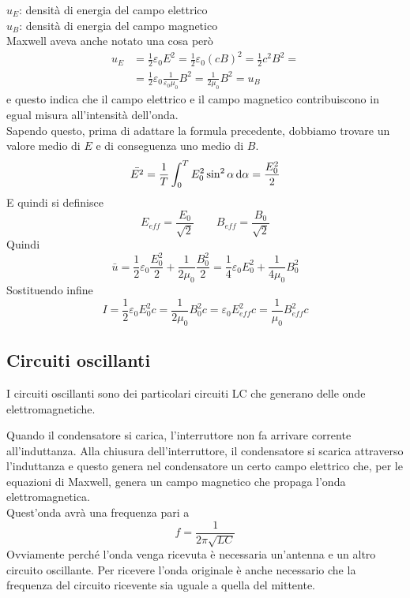 $u_E$: densità di energia del campo elettrico\\
$u_B$: densità di energia del campo magnetico\\ [\baselineskip]
Maxwell aveva anche notato una cosa però
\begin{align*}
  u_E &= \frac{1}{2}\varepsilon_0E^2=\frac{1}{2}\varepsilon_0(cB)^2=\frac{1}{2}c^2B^2=\\
      &= \frac{1}{2}\varepsilon_0 \frac{1}{\varepsilon_0\mu_0}B^2= \frac{1}{2\mu_0}B^2=u_B
\end{align*}
e questo indica che il campo elettrico e il campo magnetico contribuiscono in egual misura
all'intensità dell'onda.\\
Sapendo questo, prima di adattare la formula precedente, dobbiamo trovare un valore medio di $E$
e di conseguenza uno medio di $B$.
\begin{equation*}
  \bar{E^2}=\frac{1}{T}\int_0^T E_0^2\sin^2\alpha\mathop{}\!\mathrm{d}\alpha=\frac{E_0^2}{2}
\end{equation*}
E quindi si definisce
\begin{equation*}
  E_{eff} = \frac{E_0}{\sqrt{2}} \qquad B_{eff} = \frac{B_0}{\sqrt{2}}
\end{equation*}
Quindi
\begin{equation*}
  \bar{u}=\frac{1}{2}\varepsilon_0 \frac{E_0^2}{2}+\frac{1}{2\mu_0}\frac{B_0^2}{2}=
  \frac{1}{4}\varepsilon_0E_0^2+\frac{1}{4\mu_0}B_0^2
\end{equation*}
Sostituendo infine
\begin{equation*}
  I=\frac{1}{2}\varepsilon_0E_0^2c=\frac{1}{2\mu_0}B_0^2c=\varepsilon_0E_{eff}^2c=\frac{1}{\mu_0}
  B_{eff}^2c
\end{equation*}

\subsection{Circuiti oscillanti}
I circuiti oscillanti sono dei particolari circuiti LC che generano delle onde elettromagnetiche.
\begin{center}
\end{center}
Quando il condensatore si carica, l'interruttore non fa arrivare corrente all'induttanza. Alla
chiusura dell'interruttore, il condensatore si scarica attraverso l'induttanza e questo genera
nel condensatore un certo campo elettrico che, per le equazioni di Maxwell, genera un campo
magnetico che propaga l'onda elettromagnetica.\\
Quest'onda avrà una frequenza pari a
\begin{equation*}
  f = \frac{1}{2\pi\sqrt{LC}}
\end{equation*}
Ovviamente perché l'onda venga ricevuta è necessaria un'antenna e un altro circuito oscillante. 
Per ricevere l'onda originale è anche necessario che la frequenza del circuito ricevente sia uguale
a quella del mittente.

